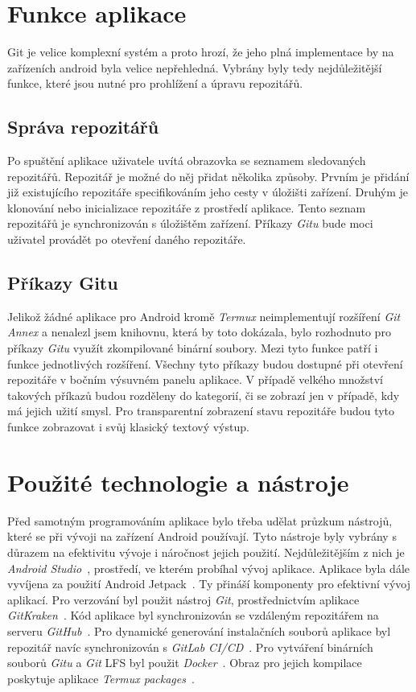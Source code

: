 \section{Funkce aplikace}
Git je velice komplexní systém a proto hrozí, že jeho plná implementace by na zařízeních android byla velice nepřehledná. Vybrány byly tedy nejdůležitější funkce, které jsou nutné pro prohlížení a úpravu repozitářů. 

    \subsection{Správa repozitářů}
    Po spuštění aplikace uživatele uvítá obrazovka se seznamem sledovaných repozitářů. Repozitář je možné do něj přidat několika způsoby. Prvním je přidání již existujícího repozitáře specifikováním jeho cesty v úložišti zařízení. Druhým je klonování nebo inicializace repozitáře z prostředí aplikace. Tento seznam repozitářů je synchronizován s úložištěm zařízení. Příkazy \emph{Gitu} bude moci uživatel provádět po otevření daného repozitáře.

    \subsection{Příkazy Gitu}
    Jelikož žádné aplikace pro Android kromě \emph{Termux} neimplementují rozšíření \emph{Git Annex} a nenalezl jsem knihovnu, která by toto dokázala, bylo rozhodnuto pro příkazy \emph{Gitu} využít zkompilované binární soubory. Mezi tyto funkce patří i funkce jednotlivých rozšíření. Všechny tyto příkazy budou dostupné při otevření repozitáře v bočním výsuvném panelu aplikace. V případě velkého množství takových příkazů budou rozděleny do kategorií, či se zobrazí jen v případě, kdy má jejich užití smysl. Pro transparentní zobrazení stavu repozitáře budou tyto funkce zobrazovat i svůj klasický textový výstup.

\section{Použité technologie a nástroje}
Před samotným programováním aplikace bylo třeba udělat průzkum nástrojů, které se při vývoji na zařízení Android používají. Tyto nástroje byly vybrány s důrazem na efektivitu vývoje i náročnost jejich použití. Nejdůležitějším z nich je \emph{Android Studio}~, prostředí, ve kterém probíhal vývoj aplikace. Aplikace byla dále vyvíjena za použití Android Jetpack~. Ty přináší komponenty pro efektivní vývoj aplikací. Pro verzování byl použit nástroj \emph{Git}, prostřednictvím aplikace \emph{GitKraken}~. Kód aplikace byl synchronizován se vzdáleným repozitářem na serveru \emph{GitHub}~. Pro dynamické generování instalačních souborů aplikace byl repozitář navíc synchronizován s \emph{GitLab CI/CD}~. Pro vytváření binárních souborů \emph{Gitu} a \emph{Git} LFS byl použit \emph{Docker}~. Obraz pro jejich kompilace poskytuje aplikace \emph{Termux packages}~.

